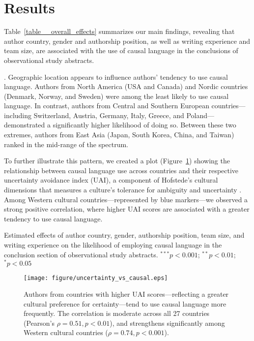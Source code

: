 \section{Results}


Table~\ref{table__overall_effects} 
summarizes our main findings, revealing 
that author country, gender and authorship position, as well as writing experience and
team size, are associated with the use of causal language in the
conclusions of observational study abstracts.

.
Geographic location appears to influence authors' tendency to use causal
language. Authors from North America (USA and Canada) and Nordic
countries (Denmark, Norway, and Sweden) were among the least likely to use
causal language. In contrast, authors from Central and Southern European
countries—including Switzerland, Austria, Germany, Italy, Greece, and
Poland—demonstrated a significantly higher likelihood of doing so.
Between these two extremes, authors from East Asia (Japan, South Korea, China, and
Taiwan) ranked in the mid-range of the spectrum.


To further illustrate this pattern, we created a plot
(Figure~\ref{fig__uncertainty_vs_causal_all}) showing the relationship
between causal language use across countries and their respective
uncertainty avoidance index (UAI),
a component of Hofstede's cultural dimensions that measures a culture's tolerance for ambiguity and uncertainty \cite{hofstede2010}.
Among Western cultural countries—represented by blue
markers—we observed a strong positive correlation, where higher UAI scores are
associated with a greater tendency to use causal language. 


\begin{table}[!th]
\centering

\caption{
Estimated effects of author country, gender, authorship position, team size, and writing experience on the likelihood of employing causal language in the conclusion section of observational study abstracts.
\footnotesize{$^{***}p<0.001$; $^{**}p<0.01$; $^{*}p<0.05$}
 }
\label{table__overall_effects}
\end{table}


\begin{figure}[!th]
\centering
\texttt{[image: figure/uncertainty\_vs\_causal.eps]}
\caption{
   Authors from countries with higher UAI scores—reflecting a
    greater cultural preference for certainty—tend to use causal language more frequently.
    The correlation is moderate across all 27 countries (Pearson's $\rho=0.51, p < 0.01$), 
    and strengthens significantly among Western cultural countries ($\rho = 0.74, p < 0.001$).}
\label{fig__uncertainty_vs_causal_all}
\end{figure}


